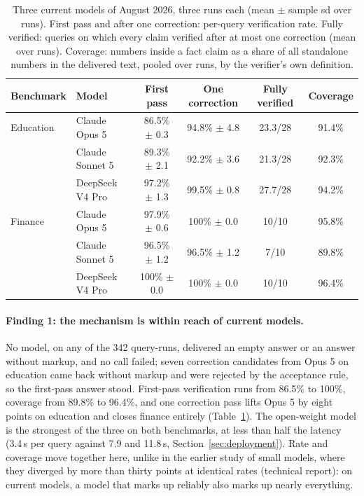 \documentclass[11pt,a4paper]{article}
\begin{document}
\begin{table}[h]
\centering
\small
\begin{tabular}{llcccc}
\toprule
\textbf{Benchmark} & \textbf{Model} & \textbf{First pass} & \textbf{One correction} & \textbf{Fully verified} & \textbf{Coverage} \\
\midrule
Education & Claude Opus 5 & 86.5\% $\pm$ 0.3 & 94.8\% $\pm$ 4.8 & 23.3/28 & 91.4\% \\
 & Claude Sonnet 5 & 89.3\% $\pm$ 2.1 & 92.2\% $\pm$ 3.6 & 21.3/28 & 92.3\% \\
 & DeepSeek V4 Pro & 97.2\% $\pm$ 1.3 & 99.5\% $\pm$ 0.8 & 27.7/28 & 94.2\% \\
\midrule
Finance & Claude Opus 5 & 97.9\% $\pm$ 0.6 & 100\% $\pm$ 0.0 & 10/10 & 95.8\% \\
 & Claude Sonnet 5 & 96.5\% $\pm$ 1.2 & 96.5\% $\pm$ 1.2 & 7/10 & 89.8\% \\
 & DeepSeek V4 Pro & 100\% $\pm$ 0.0 & 100\% $\pm$ 0.0 & 10/10 & 96.4\% \\
\bottomrule
\end{tabular}
\caption{Three current models of August 2026, three runs each (mean $\pm$ sample sd over runs). First pass and after one correction: per-query verification rate. Fully verified: queries on which every claim verified after at most one correction (mean over runs). Coverage: numbers inside a fact claim as a share of all standalone numbers in the delivered text, pooled over runs, by the verifier's own definition.}
\label{tab:frontier}
\end{table}

\paragraph{Finding 1: the mechanism is within reach of current models.} No model, on any of the 342 query-runs, delivered an empty answer or an answer without markup, and no call failed; seven correction candidates from Opus 5 on education came back without markup and were rejected by the acceptance rule, so the first-pass answer stood. First-pass verification runs from 86.5\% to 100\%, coverage from 89.8\% to 96.4\%, and one correction pass lifts Opus 5 by eight points on education and closes finance entirely (Table~\ref{tab:frontier}). The open-weight model is the strongest of the three on both benchmarks, at less than half the latency (3.4\,s per query against 7.9 and 11.8\,s, Section~\ref{sec:deployment}). Rate and coverage move together here, unlike in the earlier study of small models, where they diverged by more than thirty points at identical rates (technical report): on current models, a model that marks up reliably also marks up nearly everything.
\end{document}
